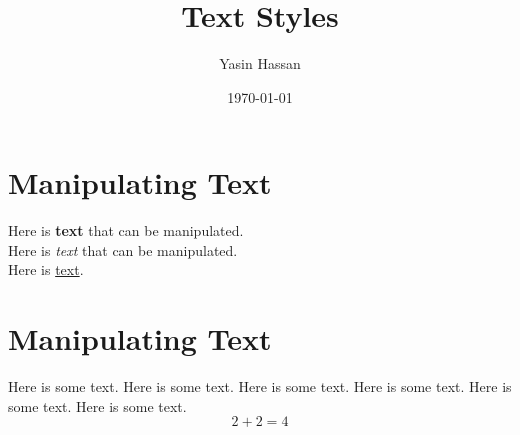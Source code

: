 \documentclass[12pt, fleqn, leqno, twocolumn, landscape]{article} %
\title{{\calligra \Huge Text Styles}}
\author{{\unclfamily Yasin Hassan}}
\date{\today}
\begin{document}
\maketitle

\section*{{\color{nextcolor} \ttfamily Manipulating Text}}

{\tiny Here} is \textbf{{\color{OliveGreen} text}} that can be {\sffamily manipulated}.\\%
\textcolor{nextcolor}{Here} is \textit{text} that can be {\ttfamily manipulated}.\\
\textcolor{mynewcolor}{{\Huge Here}} is \underline{text}.

\section*{{\color{nextcolor} \ttfamily Manipulating Text}}
Here is some text. Here is some text. Here is some text. Here is some text. Here is some text. Here is some text.
\begin{equation}
    2 + 2 = 4
\end{equation}
\end{document}
